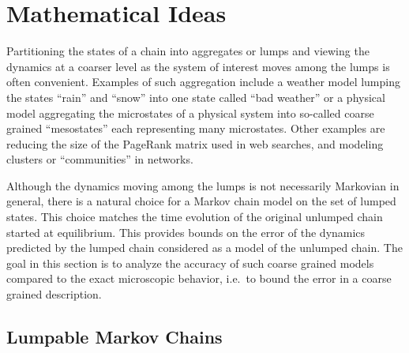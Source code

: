 \documentclass[12pt]{article}
\begin{document}
\section*{Mathematical Ideas}

Partitioning the states of a chain into
aggregates or lumps and  viewing the dynamics at a coarser level as the
system of interest moves among the lumps is often convenient.  Examples of such aggregation
include a weather model lumping the states ``rain'' and ``snow'' into
one state called ``bad weather'' or a physical model aggregating the
microstates of a physical system into so-called coarse grained
``mesostates'' each representing many microstates.  Other examples are
reducing the size of the PageRank matrix used in web searches, and
modeling clusters or ``communities'' in networks.

Although the
dynamics moving among the lumps is not necessarily Markovian in general,
there is a natural choice for a Markov chain model on the set of lumped
states.  This choice matches the time evolution of the original unlumped
chain started at equilibrium. This provides bounds on the error of the
dynamics predicted by the lumped chain considered as a model of the
unlumped chain.  The goal in this section is to analyze the accuracy of
such coarse grained models compared to the exact microscopic behavior,
i.e.\ to bound the error in a coarse grained description.

\subsection*{Lumpable Markov Chains}

\end{document}

